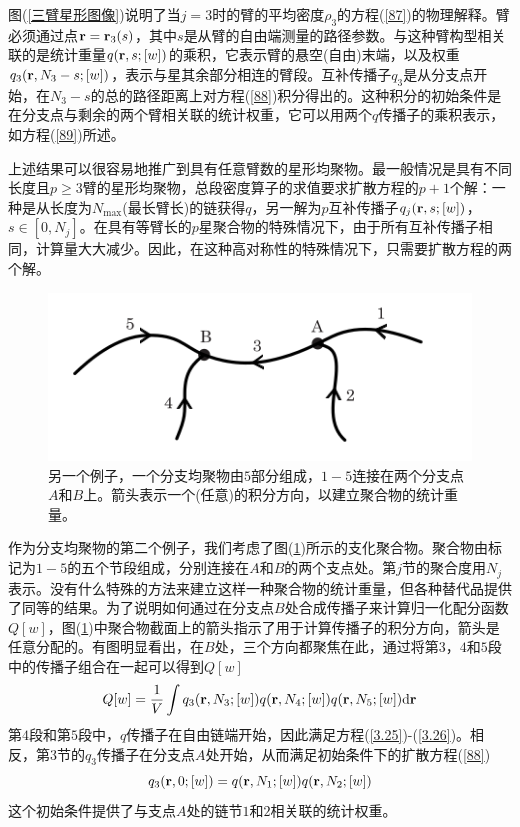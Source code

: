 图(\ref{三臂星形图像})说明了当$j=3$时的臂的平均密度$\rho _3$的方程(\ref{87})的物理解释。臂必须通过点$\mathbf{r}=\mathbf{r}_3(s)$，其中$s$是从臂的自由端测量的路径参数。与这种臂构型相关联的是统计重量$q(\mathbf{r},s;[w])$的乘积，它表示臂的悬空(自由)末端，以及权重$q_{3}(\mathbf{r},N_{3}-s;[w])$，表示与星其余部分相连的臂段。互补传播子$q_3$是从分支点开始，在$N_3-s$的总的路径距离上对方程(\ref{88})积分得出的。这种积分的初始条件是在分支点与剩余的两个臂相关联的统计权重，它可以用两个$q$传播子的乘积表示，如方程(\ref{89})所述。

上述结果可以很容易地推广到具有任意臂数的星形均聚物。最一般情况是具有不同长度且$p\geq3$臂的星形均聚物，总段密度算子的求值要求扩散方程的$p+1$个解：一种是从长度为$N_{\max}$(最长臂长)的链获得$q$，另一解为$p$互补传播子$q_j(\mathbf{r},s;[w])$，$s\in [0,N_j]$。在具有等臂长的$p$星聚合物的特殊情况下，由于所有互补传播子相同，计算量大大减少。因此，在这种高对称性的特殊情况下，只需要扩散方程的两个解。

\begin{figure}[H]
\centering
\includegraphics[scale=0.7]{Contents/chapter3/figures/36.png}
\caption{另一个例子，一个分支均聚物由$5$部分组成，$1-5$连接在两个分支点$A$和$B$上。箭头表示一个(任意)的积分方向，以建立聚合物的统计重量。}
\label{AB嵌段}
\end{figure}

作为分支均聚物的第二个例子，我们考虑了图(\ref{AB嵌段})所示的支化聚合物。聚合物由标记为$1-5$的五个节段组成，分别连接在$A$和$B$的两个支点处。第$j$节的聚合度用$N_j$表示。没有什么特殊的方法来建立这样一种聚合物的统计重量，但各种替代品提供了同等的结果。为了说明如何通过在分支点$B$处合成传播子来计算归一化配分函数$Q[w]$，图(\ref{AB嵌段})中聚合物截面上的箭头指示了用于计算传播子的积分方向，箭头是任意分配的。有图明显看出，在$B$处，三个方向都聚焦在此，通过将第$3$，$4$和$5$段中的传播子组合在一起可以得到$Q[w]$
\begin{equation}
Q[w]=\frac{1}{V}\int q_3(\mathbf{r},N_3;[w])q(\mathbf{r},N_4;[w])q(\mathbf{r},N_5;[w]) \mathrm{d}\mathbf{r}
\end{equation}
第$4$段和第$5$段中，$q$传播子在自由链端开始，因此满足方程(\ref{3.25})-(\ref{3.26})。相反，第3节的$q_3$传播子在分支点$A$处开始，从而满足初始条件下的扩散方程(\ref{88})
\begin{equation}
q_3(\mathbf{r},0;[w])=q(\mathbf{r},N_1;[w])q(\mathbf{r},N_2;[w])
\end{equation}
这个初始条件提供了与支点$A$处的链节$1$和$2$相关联的统计权重。

